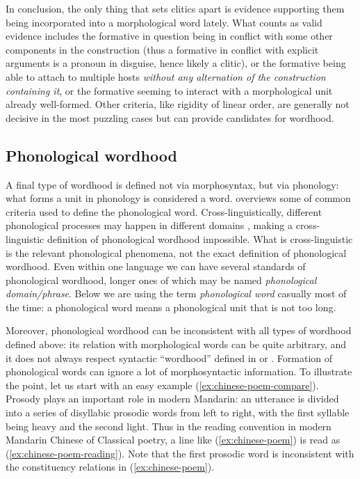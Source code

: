 \documentclass[a4paper, oneside, scheme=plain, 12pt]{article}
\newcommand*{\citesec}[1]{\S~{#1}}
\newcommand*{\citepage}[1]{p.~{#1}}
\newcommand*{\term}[1]{\emph{#1}}
\begin{document}
In conclusion, the only thing that sets clitics apart is evidence supporting
them being incorporated into a morphological word lately.
What counts as valid evidence includes 
the formative in question being in conflict with some other components in the construction
(thus a formative in conflict with explicit arguments is a pronoun in disguise,
hence likely a clitic),
or the formative being able to attach to multiple hosts
\emph{without any alternation of the construction containing it},
or the formative seeming to interact with a morphological unit already well-formed.
Other criteria, like rigidity of linear order,
are generally not decisive in the most puzzling cases
but can provide candidates for wordhood.

\subsection{Phonological wordhood}\label{sec:phonological}

A final type of wordhood is defined not via morphosyntax, but via phonology:
what forms a unit in phonology is considered a word.
\citet[\citesec{10.3}]{dixon2010basic2} overviews some of common criteria used to define the phonological word.
Cross-linguistically, different phonological processes may happen in different domains \citep[\citepage{62}]{schackow2015grammar},
making a cross-linguistic definition of phonological wordhood impossible.
What is cross-linguistic is the relevant phonological phenomena,
not the exact definition of phonological wordhood.
Even within one language we can have several standards of phonological wordhood,
longer ones of which may be named \term{phonological domain/phrase}.
Below we are using the term \term{phonological word} casually most of the time:
a phonological word means a phonological unit that is not too long.

Moreover, phonological wordhood can be inconsistent with all types of wordhood defined above:
its relation with morphological words can be quite arbitrary,
and it does not always respect syntactic ``wordhood'' defined in  or .
Formation of phonological words can ignore a lot of morphosyntactic information.
To illustrate the point, let us start with an easy example (\ref{ex:chinese-poem-compare}).
Prosody plays an important role in modern Mandarin:
an utterance is divided into a series of disyllabic prosodic words from left to right,
with the first syllable being heavy and the second light.
Thus in the reading convention in modern Mandarin Chinese of Classical poetry,
a line like (\ref{ex:chinese-poem}) is read as (\ref{ex:chinese-poem-reading}).
Note that the first prosodic word is inconsistent with the constituency relations in (\ref{ex:chinese-poem}).
\end{document}
